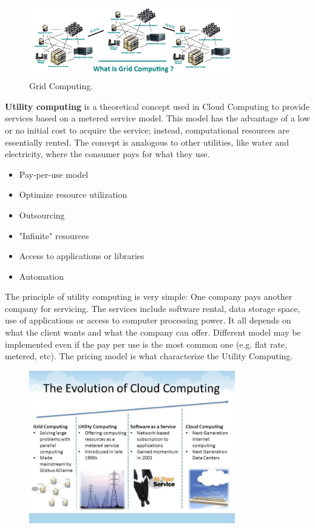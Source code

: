 \begin{figure}[H]
    \centering
    \includegraphics[width=0.8\textwidth]{assets/fig7.png}
    \caption{Grid Computing.}
    \label{fig:7}
\end{figure}

\textbf{Utility computing} is a theoretical concept used in Cloud Computing to provide services based on a metered service model. This model has the advantage of a low or no initial cost to acquire the service; instead, computational resources are essentially rented. The concept is analogous to other utilities, like water and electricity, where the consumer pays for what they use.
\begin{itemize}
    \item Pay-per-use model
    \item Optimize resource utilization
    \item Outsourcing
    \item "Infinite" resources
    \item Access to applications or libraries 
    \item Automation
\end{itemize}

The principle of utility computing is very simple: One company pays
another company for servicing. The services include software rental,
data storage space, use of applications or access to computer processing
power. It all depends on what the client wants and what the company
can offer. Different model may be implemented even if the pay per use is the most
common one (e.g. flat rate, metered, etc). The pricing model is what characterize the Utility Computing.

\begin{figure}[H]
    \centering
    \includegraphics[width=0.8\textwidth]{assets/fig8.png}
\end{figure}

